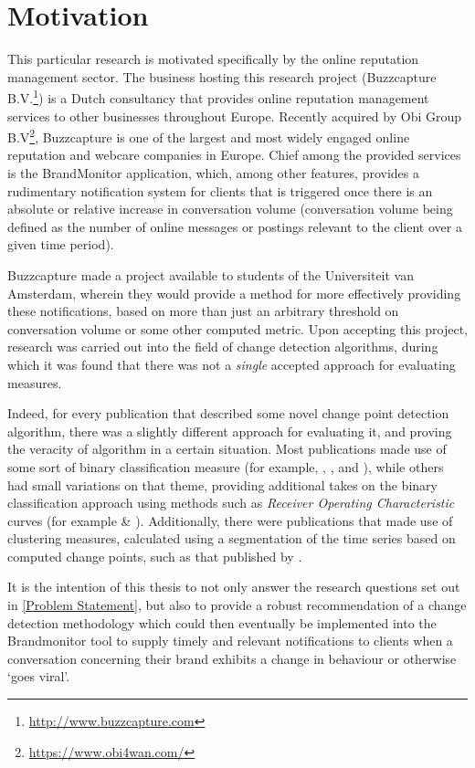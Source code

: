 \documentclass[../main.tex]{subfiles}
\begin{document}
\section{Motivation}

This particular research is motivated specifically by the online reputation management sector. The business hosting this research project (Buzzcapture B.V.\footnote{\url{http://www.buzzcapture.com}}) is a Dutch consultancy that provides online reputation management services to other businesses throughout Europe. Recently acquired by Obi Group B.V\footnote{\url{https://www.obi4wan.com/}}, Buzzcapture is one of the largest and most widely engaged online reputation and webcare companies in Europe. Chief among the provided services is the BrandMonitor application, which, among other features, provides a rudimentary notification system for clients that is triggered once there is an absolute or relative increase in conversation volume (conversation volume being defined as the number of online messages or postings relevant to the client over a given time period).

Buzzcapture made a project available to students of the Universiteit van Amsterdam, wherein they would provide a method for more effectively providing these notifications, based on more than just an arbitrary threshold on conversation volume or some other computed metric. Upon accepting this project, research was carried out into the field of change detection algorithms, during which it was found that there was not a \emph{single} accepted approach for evaluating measures.

Indeed, for every publication that described some novel change point detection algorithm, there was a slightly different approach for evaluating it, and proving the veracity of algorithm in a certain situation. Most publications made use of some sort of binary classification measure (for example, \citeauthor{Qahtan2015} \cite{Qahtan2015}, \citeauthor{Buntain2014} \cite{Buntain2014}, and \citeauthor{Pelecanos2010} \cite{Pelecanos2010}), while others had small variations on that theme, providing additional takes on the binary classification approach using methods such as \emph{Receiver Operating Characteristic} curves (for example \citeauthor{Fawcett1999} \cite{Fawcett1999} \& \citeauthor{Desobry2005} \cite{Desobry2005}). Additionally, there were publications that made use of clustering measures, calculated using a segmentation of the time series based on computed change points, such as that published by \citeauthor{Matteson2012} \cite{Matteson2012}.

It is the intention of this thesis to not only answer the research questions set out in \autoref{Problem Statement}, but also to provide a robust recommendation of a change detection methodology which could then eventually be implemented into the Brandmonitor tool to supply timely and relevant notifications to clients when a conversation concerning their brand exhibits a change in behaviour or otherwise `goes viral'.
\end{document}
